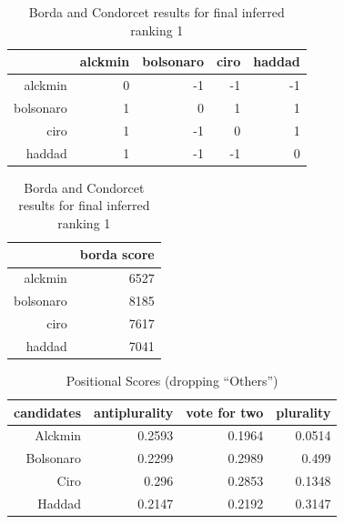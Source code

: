 \documentclass[hidelinks,11pt]{article}
\begin{document}
\begin{table}[h]
\begin{subtable}[h]{0.4\textwidth}
\centering
\begin{tabular}{rrrrr}
  \hline
 & alckmin & bolsonaro & ciro & haddad \\
  \hline
alckmin & 0 & -1 & -1 & -1 \\
  bolsonaro & 1 & 0 & 1 & 1 \\
  ciro & 1 & -1 & 0 & 1 \\
  haddad & 1 & -1 & -1 & 0 \\
   \hline
\end{tabular}
\caption{Pairwise Majority Comparisons}
\label{tbl:subtab1}
\end{subtable}
\hfill
\begin{subtable}[h]{0.4\textwidth}
  \centering
\begin{tabular}{rr}
  \hline
 & borda score \\
  \hline
alckmin & 6527 \\
  bolsonaro & 8185 \\
  ciro & 7617 \\
  haddad & 7041 \\
   \hline
\end{tabular}
\caption{Borda scores}
\label{tbl:subtab2}
\end{subtable}
\caption{Borda and Condorcet results for final inferred ranking 1}
\label{tbl:tab1}
\end{table}




\begin{table}[]
  \centering
\begin{tabular}{|r|r|r|r|}
\hline
\textbf{candidates} & \textbf{antiplurality} & \textbf{vote for two } & \textbf{plurality} \\ \hline
Alckmin                              & 0.2593                                  & 0.1964                                           & 0.0514                                      \\ \hline
Bolsonaro                            & 0.2299                                  & 0.2989                                           & 0.499                                       \\ \hline
Ciro                                 & 0.296                                   & 0.2853                                           & 0.1348                                      \\ \hline
Haddad                               & 0.2147                                  & 0.2192                                           & 0.3147                                      \\ \hline
\end{tabular}
\caption{Positional Scores (dropping ``Others'')}
\end{table}
\end{document}
